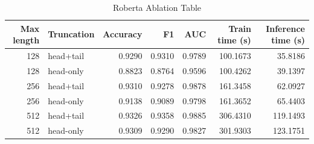 \begin{table}
\caption{Roberta Ablation Table}
\label{tab:roberta_ablation_table}
\begin{tabular}{rlrrrrr}
\toprule
Max length & Truncation & Accuracy & F1 & AUC & Train time (s) & Inference time (s) \\
\midrule
128 & head+tail & 0.9290 & 0.9310 & 0.9789 & 100.1673 & 35.8186 \\
128 & head-only & 0.8823 & 0.8764 & 0.9596 & 100.4262 & 39.1397 \\
256 & head+tail & 0.9310 & 0.9278 & 0.9878 & 161.3458 & 62.0927 \\
256 & head-only & 0.9138 & 0.9089 & 0.9798 & 161.3652 & 65.4403 \\
512 & head+tail & 0.9326 & 0.9358 & 0.9885 & 306.4310 & 119.1493 \\
512 & head-only & 0.9309 & 0.9290 & 0.9827 & 301.9303 & 123.1751 \\
\bottomrule
\end{tabular}
\end{table}
